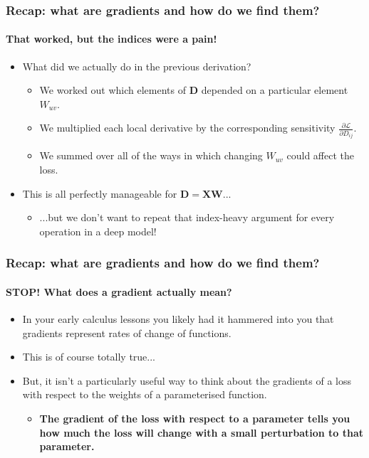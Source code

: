 \documentclass[]{article}
\begin{document}
\begin{frame}
\frametitle{Recap: what are gradients and how do we find them?}
\framesubtitle{That worked, but the indices were a pain!}

\begin{itemize}
	\item<+-> What did we actually do in the previous derivation?
	\begin{itemize}
		\item We worked out which elements of $\bm D$ depended on a particular element $W_{uv}$.
		\item We multiplied each local derivative by the corresponding sensitivity $\frac{\partial \mathcal{L}}{\partial D_{ij}}$.
		\item We summed over all of the ways in which changing $W_{uv}$ could affect the loss.
	\end{itemize}
	\item<+-> This is all perfectly manageable for $\bm D=\bm X\bm W$...
	\begin{itemize}
		\item ...but we don't want to repeat that index-heavy argument for every operation in a deep model!
	\end{itemize}
\end{itemize}

\end{frame}


\begin{frame}
\frametitle{Recap: what are gradients and how do we find them?}
\framesubtitle{STOP! What does a gradient actually mean?}

\begin{itemize}
	\item<+-> In your early calculus lessons you likely had it hammered into you that gradients represent rates of change of functions.
	\item<+-> This is of course totally true...
	\item<+-> But, it isn't a particularly useful way to think about the gradients of a loss with respect to the weights of a parameterised function.
	\begin{itemize}
		\item<+-> \textbf{The gradient of the loss with respect to a parameter tells you how much the loss will change with a small perturbation to that parameter.}
	\end{itemize}
\end{itemize}
\end{frame}
\end{document}
